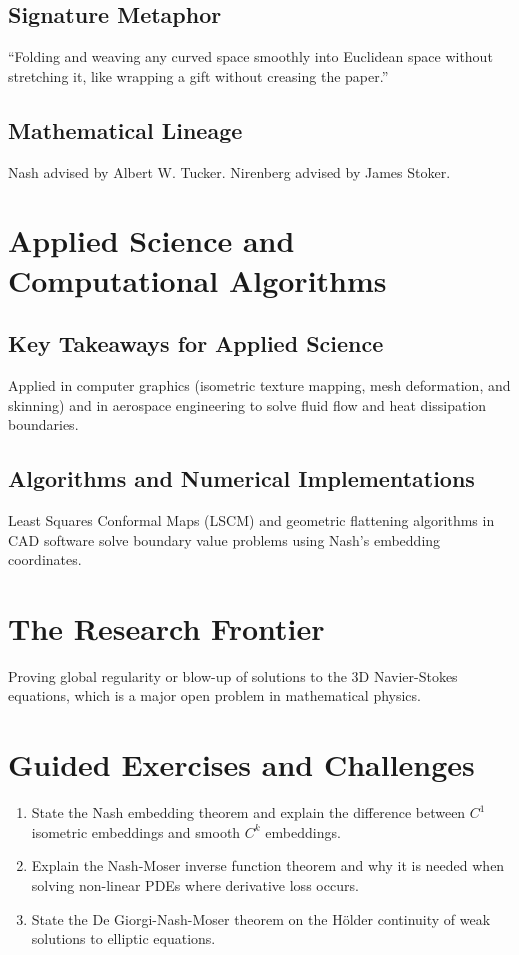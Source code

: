 \subsection{Signature Metaphor}
``Folding and weaving any curved space smoothly into Euclidean space without stretching it, like wrapping a gift without creasing the paper.''

\subsection{Mathematical Lineage}
Nash advised by Albert W. Tucker. Nirenberg advised by James Stoker.

\section{Applied Science and Computational Algorithms}
\subsection{Key Takeaways for Applied Science}
Applied in computer graphics (isometric texture mapping, mesh deformation, and skinning) and in aerospace engineering to solve fluid flow and heat dissipation boundaries.

\subsection{Algorithms and Numerical Implementations}
Least Squares Conformal Maps (LSCM) and geometric flattening algorithms in CAD software solve boundary value problems using Nash's embedding coordinates.

\section{The Research Frontier}
Proving global regularity or blow-up of solutions to the 3D Navier-Stokes equations, which is a major open problem in mathematical physics.

\section{Guided Exercises and Challenges}
\begin{enumerate}[label=\textbf{\arabic*.}]
  \item State the Nash embedding theorem and explain the difference between $C^1$ isometric embeddings and smooth $C^k$ embeddings.
  \item Explain the Nash-Moser inverse function theorem and why it is needed when solving non-linear PDEs where derivative loss occurs.
  \item State the De Giorgi-Nash-Moser theorem on the H\"older continuity of weak solutions to elliptic equations.
\end{enumerate}

